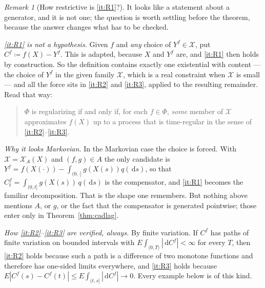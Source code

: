 \documentclass[11pt,a4paper]{article}
\theoremstyle{plain}
\theoremstyle{definition}
\theoremstyle{remark}
\newtheorem{remark}[theorem]{Remark}
\newcommand{\XX}{\mathcal{X}}                  %
\newcommand{\dif}{\,\mathrm{d}}
\begin{document}
\begin{remark}[How restrictive is \ref{it:R1}?]
  \label{rem:R1scope}
  It looks like a statement about a generator, and it is not one; the question is
  worth settling before the theorem, because the answer changes what has to be
  checked.

  \emph{\ref{it:R1} is not a hypothesis.}  Given $f$ and \emph{any} choice of
  $Y^f \in \XX$, put $C^f \coloneqq f(X) - Y^f$.  This is adapted, because $X$ and
  $Y^f$ are, and \ref{it:R1} then holds by construction.  So the definition
  contains exactly one existential with content --- the choice of $Y^f$ in the
  given family $\XX$, which is a real constraint when $\XX$ is small --- and all
  the force sits in \ref{it:R2} and \ref{it:R3}, applied to the resulting
  remainder.  Read that way:
  \begin{quote}
    $\Phi$ is regularizing if and only if, for each $f \in \Phi$, \emph{some}
    member of $\XX$ approximates $f(X)$ up to a process that is time-regular in
    the sense of \ref{it:R2}--\ref{it:R3}.
  \end{quote}

  \emph{Why it looks Markovian.}  In the Markovian case the choice is forced.
  With $\XX = \XX_A(X)$ and $(f,g) \in A$ the only candidate is
  $Y^f = f(X(\cdot)) - \int_{(0,\cdot]} g(X(s))q(\dif s)$, so that
  $C^f_t = \int_{(0,t]} g(X(s))\,q(\dif s)$ is the compensator, and \ref{it:R1}
  becomes the familiar decomposition.  That is the shape one remembers.  But
  nothing above mentions $A$, or $g$, or the fact that the compensator is
  generated pointwise; those enter only in Theorem~\ref{thm:cadlag}.

  \emph{How \ref{it:R2}--\ref{it:R3} are verified, always.}  By finite variation.
  If $C^f$ has paths of finite variation on bounded intervals with
  $E\int_{\langle 0,T\rangle}|\dif C^f| < \infty$ for every $T$, then \ref{it:R2}
  holds because such a path is a difference of two monotone functions and
  therefore has one-sided limits everywhere, and \ref{it:R3} holds because
  $E|C^f(s) - C^f(t)| \leq E\int_{(t,s]}|\dif C^f| \to 0$.  Every example below is
  of this kind.


\end{remark}
\end{document}
